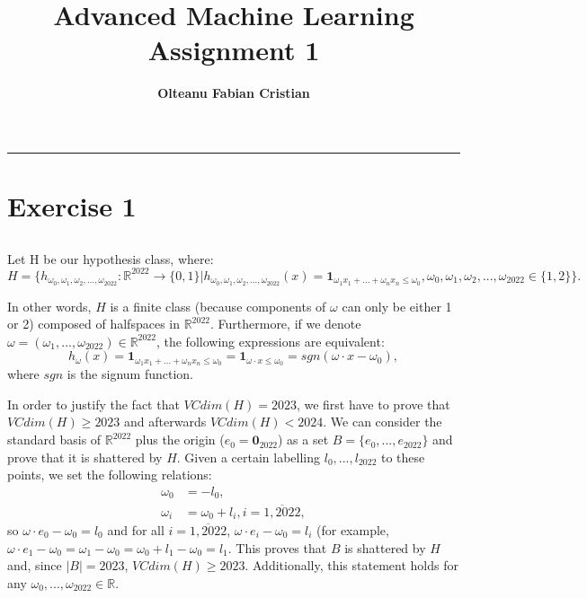 \documentclass{article}
\author{\textbf{Olteanu Fabian Cristian}}
\affil{FMI, AI Master, Year 1
}
\title{\textbf{\huge Advanced Machine Learning Assignment 1}}
\date{}
\begin{document}
\pagestyle{headings}	
\newpage
\setcounter{page}{1}
\renewcommand{\thepage}{\arabic{page}}


	
	
\setlength{\parskip}{0.5em}
	
\maketitle
	
\noindent\rule{15cm}{0.4pt}
\renewcommand{\thesubsection}{\thesection.\alph{subsection}}

\section{Exercise 1}
\subsection{}
Let H be our hypothesis class, where:
$
H=\{h_{\omega_0, \omega_1,\omega_2,...,\omega_{2022}}:\mathbb{R}^{2022} \rightarrow \{0,1\}|h_{\omega_0, \omega_1,\omega_2,...,\omega_{2022}}(x) = \mathbf{1}_{\omega_1x_1 + ... + \omega_nx_n \leq \omega_0}, \omega_0,\omega_1,\omega_2,...,\omega_{2022}\in \{1,2\}\}.
$

In other words, $H$ is a finite class (because components of $\omega$ can only be either 1 or 2) composed of halfspaces in $\mathbb{R}^{2022}$. Furthermore, if we denote $\omega=(\omega_1,...,\omega_{2022})\in \mathbb{R}^{2022}$, the following expressions are equivalent: 
$$
h_\omega(x)=\mathbf{1}_{\omega_1x_1 + ... + \omega_nx_n \leq \omega_0}=\mathbf{1}_{\omega \cdot x \leq \omega_0}=sgn(\omega \cdot x - \omega_0),
$$ where $sgn$ is the signum function.

In order to justify the fact that $VCdim(H)=2023$, we first have to prove that $VCdim(H)\geq2023$ and afterwards $VCdim(H)<2024$. We can consider the standard basis of $\mathbb{R}^{2022}$ plus the origin ($e_0=\mathbf{0}_{2022}$) as a set $B=\{e_0,...,e_{2022}\}$ and prove that it is shattered by $H$. Given a certain labelling $l_0,...,l_{2022}$ to these points, we set the following relations:
\begin{align*}
\omega_0 &= -l_0, \\
\omega_i &= \omega_0 + l_i, i=\overline{1,2022},
\end{align*}
so $\omega \cdot e_0 - \omega_0=l_0$ and for all $i=\overline{1,2022}$, $\omega \cdot e_i - \omega_0 = l_i$ (for example, $\omega \cdot e_1 - \omega_0 = \omega_1 - \omega_0 = \omega_0 + l_1 - \omega_0 = l_1$. This proves that $B$ is shattered by $H$ and, since $|B|=2023$, $VCdim(H) \geq 2023$. Additionally, this statement holds for any $\omega_0,...,\omega_{2022} \in \mathbb{R}$.
\end{document}
